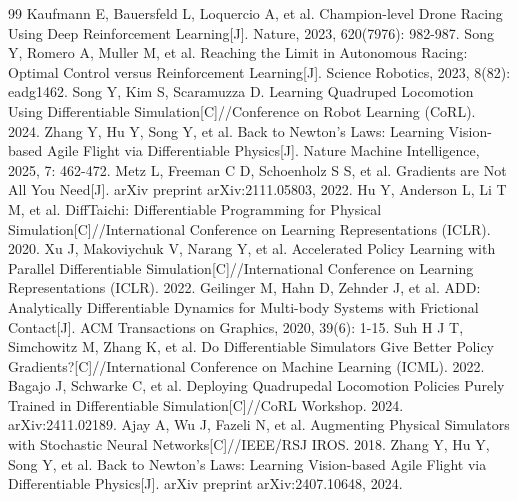 \documentclass[zihao=5, a4paper]{ctexart}
\begin{document}
\renewcommand{\refname}{参考文献：}
\begin{thebibliography}{99}
\small
{} Kaufmann E, Bauersfeld L, Loquercio A, et al. Champion-level Drone Racing Using Deep Reinforcement Learning[J]. Nature, 2023, 620(7976): 982-987.
 Song Y, Romero A, Muller M, et al. Reaching the Limit in Autonomous Racing: Optimal Control versus Reinforcement Learning[J]. Science Robotics, 2023, 8(82): eadg1462.
 Song Y, Kim S, Scaramuzza D. Learning Quadruped Locomotion Using Differentiable Simulation[C]//Conference on Robot Learning (CoRL). 2024.
 Zhang Y, Hu Y, Song Y, et al. Back to Newton's Laws: Learning Vision-based Agile Flight via Differentiable Physics[J]. Nature Machine Intelligence, 2025, 7: 462-472.
 Metz L, Freeman C D, Schoenholz S S, et al. Gradients are Not All You Need[J]. arXiv preprint arXiv:2111.05803, 2022.
 Hu Y, Anderson L, Li T M, et al. DiffTaichi: Differentiable Programming for Physical Simulation[C]//International Conference on Learning Representations (ICLR). 2020.
 Xu J, Makoviychuk V, Narang Y, et al. Accelerated Policy Learning with Parallel Differentiable Simulation[C]//International Conference on Learning Representations (ICLR). 2022.
 Geilinger M, Hahn D, Zehnder J, et al. ADD: Analytically Differentiable Dynamics for Multi-body Systems with Frictional Contact[J]. ACM Transactions on Graphics, 2020, 39(6): 1-15.
 Suh H J T, Simchowitz M, Zhang K, et al. Do Differentiable Simulators Give Better Policy Gradients?[C]//International Conference on Machine Learning (ICML). 2022.
 Bagajo J, Schwarke C, et al. Deploying Quadrupedal Locomotion Policies Purely Trained in Differentiable Simulation[C]//CoRL Workshop. 2024. arXiv:2411.02189.
 Ajay A, Wu J, Fazeli N, et al. Augmenting Physical Simulators with Stochastic Neural Networks[C]//IEEE/RSJ IROS. 2018.
 Zhang Y, Hu Y, Song Y, et al. Back to Newton's Laws: Learning Vision-based Agile Flight via Differentiable Physics[J]. arXiv preprint arXiv:2407.10648, 2024.
\end{thebibliography}
\end{document}
